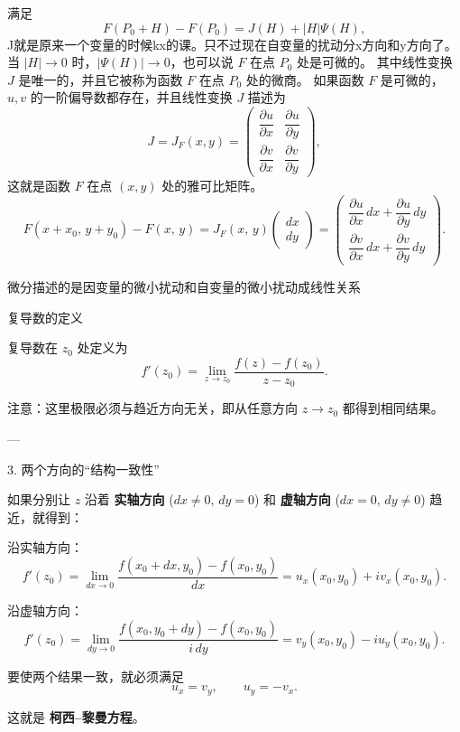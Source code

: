 \documentclass[lang=cn,10pt]{elegantbook}
\begin{document}
\begin{definition}[可微的定义]
  满足
\[
F(P_0+H)-F(P_0) = J(H) + |H|\Psi(H),
\]
J就是原来一个变量的时候kx的课。只不过现在自变量的扰动分x方向和y方向了。当 $|H|\to 0$ 时，$|\Psi(H)| \to 0$，也可以说 $F$ 在点 $P_0$ 处是可微的。  
其中线性变换 $J$ 是唯一的，并且它被称为函数 $F$ 在点 $P_0$ 处的微商。  
如果函数 $F$ 是可微的，$u, v$ 的一阶偏导数都存在，并且线性变换 $J$ 描述为
\[
J = J_F(x,y) =
\begin{pmatrix}
\dfrac{\partial u}{\partial x} & \dfrac{\partial u}{\partial y} \\[6pt]
\dfrac{\partial v}{\partial x} & \dfrac{\partial v}{\partial y}
\end{pmatrix},
\]
这就是函数 $F$ 在点 $(x,y)$ 处的雅可比矩阵。
\[
F(x+x_{0},\,y+y_{0})-F(x,\,y)
= J_{F}(x,\,y)\!\begin{pmatrix}dx\\ dy\end{pmatrix}
= 
\begin{pmatrix}
\dfrac{\partial u}{\partial x}\,dx + \dfrac{\partial u}{\partial y}\,dy \\[6pt]
\dfrac{\partial v}{\partial x}\,dx + \dfrac{\partial v}{\partial y}\,dy
\end{pmatrix}.
\]


\end{definition}
\begin{dxtips}[回顾微分的意义]
    微分描述的是因变量的微小扰动和自变量的微小扰动成线性关系
\end{dxtips}
{ 复导数的定义}

复导数在 $z_0$ 处定义为
\[
f'(z_0) = \lim_{z \to z_0} \frac{f(z) - f(z_0)}{z - z_0}.
\]

注意：这里极限必须与趋近方向无关，即从任意方向 $z \to z_0$ 都得到相同结果。

---

{3. 两个方向的“结构一致性”}

如果分别让 $z$ 沿着 \textbf{实轴方向} ($dx \neq 0,\, dy = 0$) 和 \textbf{虚轴方向} ($dx = 0,\, dy \neq 0$) 趋近，就得到：

\noindent
沿实轴方向：
\[
f'(z_0) = \lim_{dx \to 0} \frac{f(x_0+dx,y_0) - f(x_0,y_0)}{dx}
= u_x(x_0,y_0) + i v_x(x_0,y_0).
\]

\noindent
沿虚轴方向：
\[
f'(z_0) = \lim_{dy \to 0} \frac{f(x_0,y_0+dy) - f(x_0,y_0)}{i\,dy}
= v_y(x_0,y_0) - i u_y(x_0,y_0).
\]

要使两个结果一致，就必须满足
\[
u_x = v_y, \qquad u_y = -v_x.
\]

这就是 \textbf{柯西–黎曼方程}。
\end{document}
